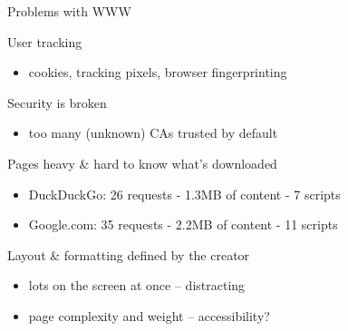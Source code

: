 \documentclass[presentation, 11pt,  aspectratio=169]{beamer}
\begin{document}
\begin{frame}[label={sec:org86f2207}]{Problems with WWW}
\begin{block}{User tracking}
\begin{itemize}
\item cookies, tracking pixels, browser fingerprinting\\
\end{itemize}
\end{block}

\begin{block}{Security is broken}
\begin{itemize}
\item too many (unknown) CAs trusted by default\\
\end{itemize}
\pause
\end{block}
\begin{block}{Pages heavy \& hard to know what's downloaded}
\begin{itemize}
\item DuckDuckGo: 26 requests - 1.3MB of content - 7 scripts\\
\item Google.com: 35 requests - 2.2MB of content - 11 scripts\\
\end{itemize}

\pause
\end{block}
\begin{block}{Layout \& formatting defined by the creator}
\begin{itemize}
\item lots on the screen at once -- distracting\\
\item page complexity and weight -- accessibility?\\
\end{itemize}
\end{block}
\end{frame}
\end{document}
